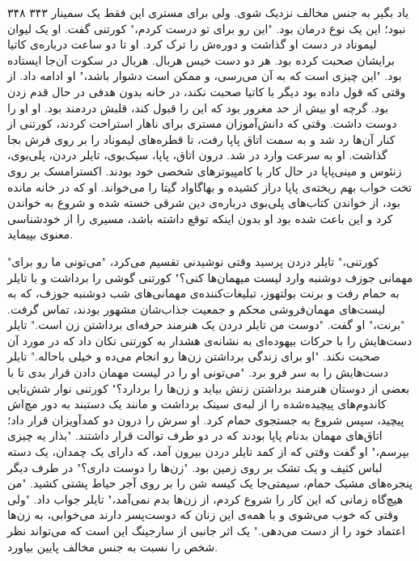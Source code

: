 ۳۴۸  
۳۴۳  
یاد بگیر به جنس مخالف نزدیک شوی. ولی برای مستری این فقط یک سمینار نبود؛ این یک نوع درمان بود.  
"این رو برای تو درست کردم،" کورتنی گفت. او یک لیوان لیموناد در دست  
او گذاشت و دوره‌ش را ترک کرد. او تا دو ساعت درباره‌ی کاتیا برایشان صحبت کرده بود.  
هر دو دست خیس هربال. هربال در سکوت آن‌جا ایستاده بود.  
"این چیزی است که به آن می‌رسی، و ممکن است دشوار باشد،" او ادامه داد.  
از وقتی که قول داده بود دیگر با کاتیا صحبت نکند، در خانه بدون هدفی در حال قدم زدن بود. گرچه او بیش از حد مغرور  
بود که این را قبول کند، قلبش دردمند بود. او او را دوست داشت.  
وقتی که دانش‌آموزان مستری برای ناهار استراحت کردند، کورتنی از کنار آن‌ها رد شد و  
به سمت اتاق پاپا رفت، تا قطره‌های لیموناد را بر روی فرش بجا گذاشت. او به سرعت وارد در شد. درون اتاق، پاپا، سیک‌بوی، تایلر دردن، پلی‌بوی، زنئوس و مینی‌پاپا در حال کار با کامپیوترهای شخصی خود بودند.  
اکسترامسک بر روی تخت خواب بهم ریخته‌ی پاپا دراز کشیده و بهاگاواد گیتا را می‌خواند.  
او که در خانه مانده بود، از خواندن کتاب‌های پلی‌بوی درباره‌ی دین شرقی خسته شده و شروع به خواندن  
کرد و این باعث شده بود او بدون اینکه توقع داشته باشد، مسیری را از خودشناسی معنوی بپیماید.  
    
"کورتنی،" تایلر دردن پرسید وقتی نوشیدنی تقسیم می‌کرد، "می‌تونی  
ما رو برای مهمانی جوزف دوشنبه وارد لیست میهمان‌ها کنی؟"  
کورتنی گوشی را برداشت و با تایلر به حمام رفت و برنت بولتهوز، تبلیغات‌کننده‌ی  
مهمانی‌های شب دوشنبه جوزف، که به لیست‌های مهمان‌فروشی محکم و جمعیت جذاب‌شان مشهور بودند، تماس گرفت.  
"برنت،" او گفت. "دوست من تایلر دردن یک هنرمند حرفه‌ای برداشتن زن است."  
تایلر دست‌هایش را با حرکات بیهوده‌ای به نشانه‌ی هشدار به کورتنی تکان داد که در مورد آن صحبت نکند.  
"او برای زندگی برداشتن زن‌ها رو انجام می‌ده و خیلی  
باحاله." تایلر دست‌هایش را به سر فرو برد. "می‌تونی او را در لیست مهمان دادن قرار بدی تا با بعضی از دوستان  
هنرمند برداشتن زنش بیاید و زن‌ها را بردارد؟"  
کورتنی نوار شش‌تایی کاندوم‌های پیچیده‌شده را از لبه‌ی  
سینک برداشت و مانند یک دستبند به دور مچ‌اش پیچید، سپس شروع به جستجوی  
حمام کرد. او سرش را درون دو کمد‌آویزان قرار داد؛ اتاق‌های مهمان بدنام پاپا بودند که در دو طرف توالت  
قرار داشتند.  
"بذار یه چیزی بپرسم،" او گفت وقتی که از کمد تایلر دردن بیرون آمد، که دارای یک چمدان،  
یک دسته لباس کثیف و یک تشک بر روی زمین بود. "زن‌ها را دوست داری؟"  
در طرف دیگر پنجره‌های مشبک حمام، سیمتی‌جا یک کیسه شن را بر روی آجر حیاط پشتی کشید.  
"من هیچ‌گاه زمانی که این کار را شروع کردم، از زن‌ها بدم نمی‌آمد،" تایلر جواب داد.  
"ولی وقتی که خوب می‌شوی و با همه‌ی این زنان که دوست‌پسر دارند می‌خوابی، به زن‌ها اعتماد  
خود را از دست می‌دهی."  
یک اثر جانبی از سارجینگ این است که می‌تواند نظر شخص را نسبت به جنس مخالف پایین بیاورد.